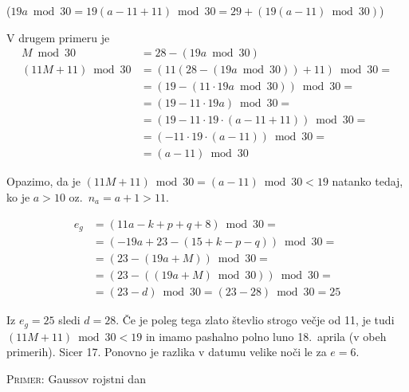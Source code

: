 \documentclass[a4paper,12pt]{article}
\begin{document}
($19 a \bmod 30 = 19 (a - 11 + 11) \bmod 30 = 29 + (19 (a - 11) \bmod 30)$)

V drugem primeru je 
\begin{align*}
    M \bmod 30 &= 28 - (19 a \bmod 30) \\
    (11 M + 11) \bmod 30 &= (11 (28 - (19 a \bmod 30)) + 11) \bmod 30 = \\
        &= (19 - (11 \cdot 19 a \bmod 30)) \bmod 30 = \\
        &= (19 - 11 \cdot 19 a) \bmod 30 = \\
        &= (19 - 11 \cdot 19 \cdot (a - 11 + 11)) \bmod 30 = \\
        &= (-11 \cdot 19 \cdot (a - 11)) \bmod 30 = \\
        &= (a - 11) \bmod 30
\end{align*}

Opazimo, da je $(11M + 11) \bmod 30 = (a - 11) \bmod 30 < 19$ natanko tedaj, ko je 
$a > 10$ oz.\ $n_a = a + 1 > 11$.

\begin{align*}
    e_g &= (11a - k + p + q + 8) \bmod 30 = \\
        &= (-19 a + 23 - (15 + k - p - q)) \bmod 30 = \\
        &= (23 - (19 a + M)) \bmod 30 = \\
        &= (23 - ((19 a + M) \bmod 30)) \bmod 30 = \\
        &= (23 - d) \bmod 30 = (23 - 28) \bmod 30 = 25
\end{align*}

Iz $e_g = 25$ sledi $d = 28$. Če je poleg tega zlato števlio strogo večje od 11, je 
tudi $(11M + 11) \bmod 30 < 19$ in imamo pashalno polno luno 18.\ aprila (v obeh 
primerih). Sicer 17. Ponovno je razlika v datumu velike noči le za $e = 6$.


\textsc{Primer:} Gaussov rojstni dan
\end{document}
